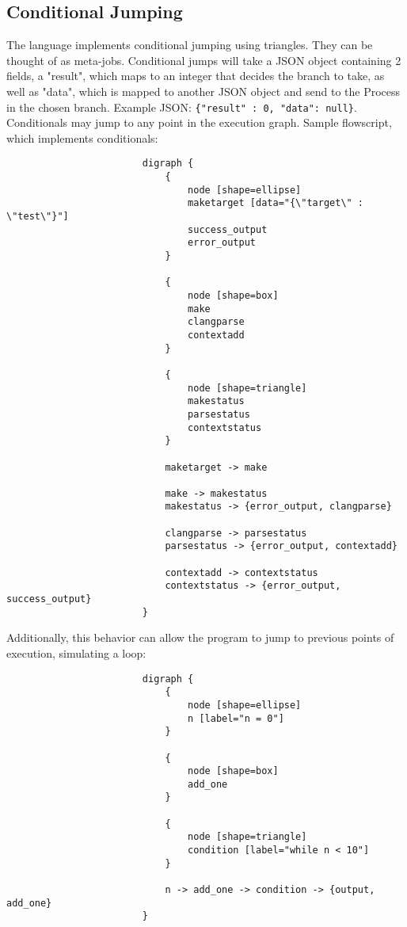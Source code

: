 \documentclass{article}
\begin{document}
			\subsection{Conditional Jumping}
				The language implements conditional jumping using triangles. They can be thought of as meta-jobs. Conditional jumps will take a JSON object containing 2 fields, a "result", which maps to an integer that decides the branch to take, as well as "data", which is mapped to another JSON object and send to the Process in the chosen branch. Example JSON: \texttt{\{"result" : 0, "data":  null\}}. Conditionals may jump to any point in the execution graph. Sample flowscript, which implements conditionals:
					\begin{verbatim}
						digraph {
						    {
						        node [shape=ellipse]
						        maketarget [data="{\"target\" : \"test\"}"]
						        success_output
						        error_output
						    }

						    {
						        node [shape=box]
						        make
						        clangparse
						        contextadd
						    }

						    {
						        node [shape=triangle]
						        makestatus 
						        parsestatus
						        contextstatus
						    }

						    maketarget -> make

						    make -> makestatus
						    makestatus -> {error_output, clangparse}
    
						    clangparse -> parsestatus
						    parsestatus -> {error_output, contextadd}

						    contextadd -> contextstatus
						    contextstatus -> {error_output, success_output}
						}
					\end{verbatim}
				Additionally, this behavior can allow the program to jump to previous points of execution, simulating a loop:
					\begin{verbatim}
						digraph {
						    {
						        node [shape=ellipse]
						        n [label="n = 0"]
						    }

						    {
						        node [shape=box]
						        add_one
						    }

						    {
						        node [shape=triangle]
						        condition [label="while n < 10"]
						    }

						    n -> add_one -> condition -> {output, add_one}
						}
					\end{verbatim}
\end{document}
